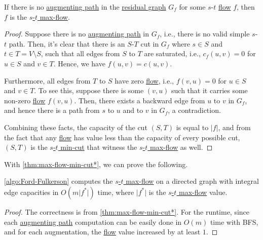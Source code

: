 \begin{theorem}\label{thm:max-flow-min-cut*}
	If there is no \hyperref[def:augmenting-path]{augmenting path} in the \hyperref[def:residual-graph]{residual graph} \(G_f\) for some \(s\)-\(t\) \hyperref[def:flow]{flow} \(f\), then \(f\) is the \hyperref[prb:s-t-max-flow]{\(s\)-\(t\) max-flow}.
\end{theorem}
\begin{proof}
	Suppose there is no \hyperref[def:augmenting-path]{augmenting path} in \(G_f\), i.e., there is no valid simple \(s\)-\(t\) path. Then, it's clear that there is an \(S\)-\(T\) cut in \(G_f\) where \(s \in S\) and \(t \in T = V \setminus S\), such that all edges from \(S\) to \(T\) are saturated, i.e., \(c_f(u, v) = 0\) for \(u \in S\) and \(v \in T\). Hence, we have \(f(u, v) = c(u, v)\).

	Furthermore, all edges from \(T\) to \(S\) have zero \hyperref[def:flow]{flow}, i.e., \(f(v, u) = 0\) for \(u \in S\) and \(v \in T\). To see this, suppose there is some \((v, u)\) such that it carries some non-zero \hyperref[def:flow]{flow} \(f(v, u)\). Then, there exists a backward edge from \(u\) to \(v\) in \(G_f\), and hence there is a path from \(s\) to \(u\) and to \(v\) in \(G_f\), a contradiction.

	Combining these facts, the capacity of the cut \((S, T)\) is equal to \(\lvert f \rvert \), and from the fact that any \hyperref[def:flow]{flow} has value less than the capacity of every possible cut, \((S, T)\) is the \hyperref[prb:s-t-min-cut]{\(s\)-\(t\) min-cut} that witness the \hyperref[prb:s-t-max-flow]{\(s\)-\(t\) max-flow} as well.
\end{proof}

With \autoref{thm:max-flow-min-cut*}, we can prove the following.

\begin{theorem}\label{thm:Ford-Fulkerson}
	\autoref{algo:Ford-Fulkerson} computes the \hyperref[prb:s-t-max-flow]{\(s\)-\(t\) max-flow} on a directed graph with integral edge capacities in \(O(m \lvert f^{\ast} \rvert)\) time, where \(\lvert f^{\ast} \rvert \) is the \hyperref[prb:s-t-max-flow]{\(s\)-\(t\) max-flow} value.
\end{theorem}
\begin{proof}
	The correctness is from \autoref{thm:max-flow-min-cut*}. For the runtime, since each \hyperref[def:augmenting-path]{augmenting path} computation can be easily done in \(O(m)\) time with BFS, and for each augmentation, the \hyperref[def:flow]{flow} value increased by at least \(1\).
\end{proof}

